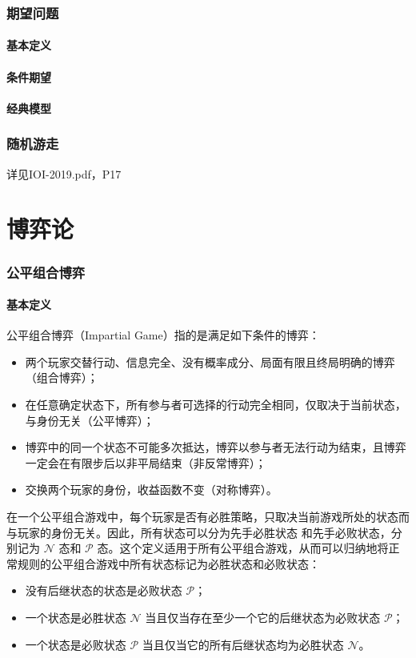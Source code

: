 \documentclass[12pt,a4paper]{article}
\begin{document}
\section{期望问题}
\subsection{基本定义} %
\subsection{条件期望}
\subsection{经典模型} %

\newpage
\section{随机游走}
详见IOI-2019.pdf，P17

\newpage
\part{博弈论}
\section{公平组合博弈}
\subsection{基本定义}
公平组合博弈（Impartial Game）指的是满足如下条件的博弈：
\begin{itemize}
	\item 两个玩家交替行动、信息完全、没有概率成分、局面有限且终局明确的博弈（组合博弈）；
	\item 在任意确定状态下，所有参与者可选择的行动完全相同，仅取决于当前状态，与身份无关（公平博弈）；
	\item 博弈中的同一个状态不可能多次抵达，博弈以参与者无法行动为结束，且博弈一定会在有限步后以非平局结束（非反常博弈）；
	\item 交换两个玩家的身份，收益函数不变（对称博弈）。
\end{itemize}
在一个公平组合游戏中，每个玩家是否有必胜策略，只取决当前游戏所处的状态而与玩家的身份无关。因此，所有状态可以分为先手必胜状态 和先手必败状态，分别记为 $\mathcal N$ 态和 $\mathcal P$ 态。这个定义适用于所有公平组合游戏，从而可以归纳地将正常规则的公平组合游戏中所有状态标记为必胜状态和必败状态：
\begin{itemize}
	\item 没有后继状态的状态是必败状态 $\mathcal P$；
	\item 一个状态是必胜状态 $\mathcal N$ 当且仅当存在至少一个它的后继状态为必败状态 $\mathcal P$；
	\item 一个状态是必败状态 $\mathcal P$ 当且仅当它的所有后继状态均为必胜状态 $\mathcal N$。
\end{itemize}
\end{document}
